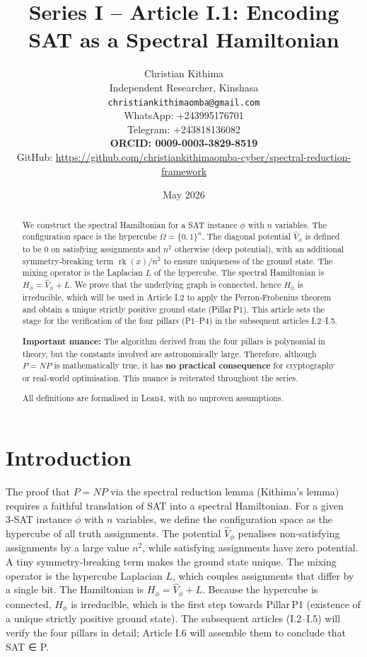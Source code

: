 \documentclass[11pt,a4paper]{article}
\title{Series I – Article I.1: Encoding SAT as a Spectral Hamiltonian}
\author{Christian Kithima \\
Independent Researcher, Kinshasa \\
\texttt{christiankithimaomba@gmail.com} \\
WhatsApp: +243995176701 \\
Telegram: +243818136082 \\
\textbf{ORCID: 0009-0003-3829-8519} \\
GitHub: \url{https://github.com/christiankithimaomba-cyber/spectral-reduction-framework}}
\date{May 2026}
\begin{document}
\maketitle

\begin{abstract}
We construct the spectral Hamiltonian for a SAT instance $\phi$ with $n$ variables. The configuration space is the hypercube $\Omega = \{0,1\}^n$. The diagonal potential $\hat{V}_\phi$ is defined to be $0$ on satisfying assignments and $n^2$ otherwise (deep potential), with an additional symmetry‑breaking term $\operatorname{rk}(x)/n^2$ to ensure uniqueness of the ground state. The mixing operator is the Laplacian $L$ of the hypercube. The spectral Hamiltonian is $H_\phi = \hat{V}_\phi + L$. We prove that the underlying graph is connected, hence $H_\phi$ is irreducible, which will be used in Article I.2 to apply the Perron‑Frobenius theorem and obtain a unique strictly positive ground state (Pillar P1). This article sets the stage for the verification of the four pillars (P1–P4) in the subsequent articles I.2–I.5.

\textbf{Important nuance:} The algorithm derived from the four pillars is polynomial in theory, but the constants involved are astronomically large. Therefore, although $P = NP$ is mathematically true, it has \textbf{no practical consequence} for cryptography or real‑world optimisation. This nuance is reiterated throughout the series.

All definitions are formalised in Lean4, with no unproven assumptions.
\end{abstract}

\tableofcontents

\section{Introduction}

The proof that $P = NP$ via the spectral reduction lemma (Kithima's lemma) requires a faithful translation of SAT into a spectral Hamiltonian. For a given 3‑SAT instance $\phi$ with $n$ variables, we define the configuration space as the hypercube of all truth assignments. The potential $\hat{V}_\phi$ penalises non‑satisfying assignments by a large value $n^2$, while satisfying assignments have zero potential. A tiny symmetry‑breaking term makes the ground state unique. The mixing operator is the hypercube Laplacian $L$, which couples assignments that differ by a single bit. The Hamiltonian is $H_\phi = \hat{V}_\phi + L$. Because the hypercube is connected, $H_\phi$ is irreducible, which is the first step towards Pillar P1 (existence of a unique strictly positive ground state). The subsequent articles (I.2–I.5) will verify the four pillars in detail; Article I.6 will assemble them to conclude that SAT ∈ P.
\end{document}
